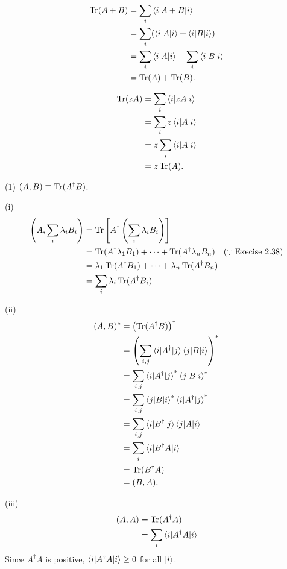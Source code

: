 \begin{align*}
	\operatorname{Tr} (A + B) &= \sum_i \braket{i | A+B | i}\\
		&= \sum_i (\braket{i|A|i}  + \braket{i | B | i}  )\\
		&= \sum_i \braket{i|A|i} + \sum_i \braket{i|B|i}\\
		&= \operatorname{Tr} (A) + \operatorname{Tr} (B).
\end{align*}

\begin{align*}
	\operatorname{Tr} (z A) &=  \sum_i \braket{i | z A | i}\\
		&= \sum_i z \braket{i | A | i}\\
		&= z \sum_i \braket{i | A | i}\\
		&= z \operatorname{Tr} (A).
\end{align*}





(1) $(A, B) \equiv \operatorname{Tr} (A^\dagger B)$.

\vspace{5mm}
(i)
\begin{align*}
	\left(A, \sum_i \lambda_i B_i \right) &= \operatorname{Tr} \left[ A^\dagger \left(\sum_i \lambda_i B_i  \right) \right]\\
		&= \operatorname{Tr} (A^\dagger \lambda_1 B_1) + \cdots +  \operatorname{Tr} (A^\dagger \lambda_n B_n) ~~~ (\because \text{Execise 2.38}) \\
		&= \lambda_1 \operatorname{Tr} (A^\dagger B_1)  + \cdots  + \lambda_n \operatorname{Tr} (A^\dagger B_n) \\
		&= \sum_i \lambda_i \operatorname{Tr} (A^\dagger B_i)
\end{align*}


(ii)
\begin{align*}
	(A, B)^* &= \left( \operatorname{Tr} (A^\dagger B) \right)^*\\
		&= \left(\sum_{i,j} \braket{ i | A^\dagger | j} \braket{j | B | i}  \right)^*\\
		&= \sum_{i,j} \braket{ i | A^\dagger | j}^* \braket{j | B | i}^*\\
		&= \sum_{i,j}  \braket{j | B | i}^* \braket{ i | A^\dagger | j}^*\\
		&=  \sum_{i,j}  \braket{i | B^\dagger | j} \braket{ j | A | i}\\
		&= \sum_i \braket{i | B^\dagger A | i} \\
		&= \operatorname{Tr} (B^\dagger A)\\
		&= (B, A).
\end{align*}


(iii)
\begin{align*}
	(A, A) &= \operatorname{Tr} (A^\dagger A)\\
		&= \sum_i \braket{ i | A^\dagger A | i }
\end{align*}
Since $A^\dagger A$ is positive, $\braket{ i | A^\dagger A | i } \geq 0$ for all $\ket{ i }$.


